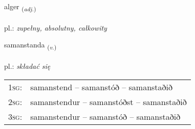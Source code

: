 \documentclass[frontgrid, backgrid]{flacards}\usepackage[]{graphicx}\usepackage[]{xcolor}
\begin{document}
\renewcommand{\blhead}{\vskip5pt {\small\bfseries\footnotesize Lýsingarorð | przymiotnik }}
\renewcommand{\bcfoot}{\vskip5pt \hspace{2pt}{\small\bfseries\footnotesize 3K}}


{alger \small{\textsubscript{(\textit{adj.})}} \\[1ex] %
\textphonetic{[alcɛr]} \\
pl.: \emph{zupełny, absolutny, całkowity} \\  [2ex]
\renewcommand*{\arraystretch}{0.8}
}

\renewcommand{\flhead}{\vskip5pt \fboxsep=0pt {\small\bfseries\footnotesize Sagnorð | czasownik}}
\renewcommand{\fcfoot}{\vskip5pt \fboxsep=0pt \hspace{2pt}{\small\bfseries\footnotesize 3K}}

\renewcommand{\blhead}{\vskip5pt {\small\bfseries\footnotesize Sagnorð | czasownik }}
\renewcommand{\bcfoot}{\vskip5pt \hspace{2pt}{\small\bfseries\footnotesize 3K}}


{samanstanda \small{\textsubscript{(\textit{v.})}} \\[1ex] %
\textphonetic{[saːmanstanta]} \\
pl.: \emph{składać się} \\  [2ex]
\renewcommand*{\arraystretch}{0.8}
\begin{tabular}{p{1cm}l}
\textsc{1sg}: & samanstend -- samanstóð -- samanstaðið \\ 
\textsc{2sg}: & samanstendur -- samanstóðst -- samanstaðið \\ 
\textsc{3sg}: & samanstendur -- samanstóð -- samanstaðið \\ 
\end{tabular}
}
\end{document}
